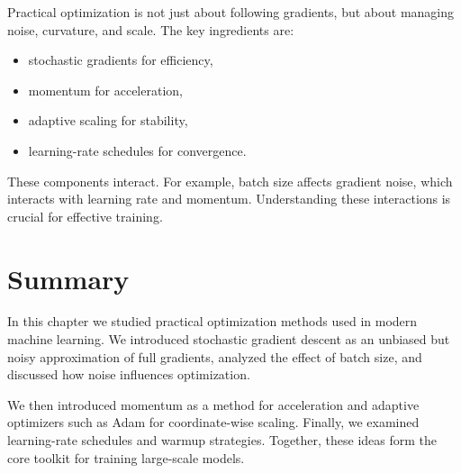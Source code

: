 Practical optimization is not just about following gradients, but about managing noise, curvature, and scale. The key ingredients are:
\begin{itemize}
    \item stochastic gradients for efficiency,
    \item momentum for acceleration,
    \item adaptive scaling for stability,
    \item learning-rate schedules for convergence.
\end{itemize}

These components interact. For example, batch size affects gradient noise, which interacts with learning rate and momentum. Understanding these interactions is crucial for effective training.

\section{Summary}

In this chapter we studied practical optimization methods used in modern machine learning. We introduced stochastic gradient descent as an unbiased but noisy approximation of full gradients, analyzed the effect of batch size, and discussed how noise influences optimization.

We then introduced momentum as a method for acceleration and adaptive optimizers such as Adam for coordinate-wise scaling. Finally, we examined learning-rate schedules and warmup strategies. Together, these ideas form the core toolkit for training large-scale models.